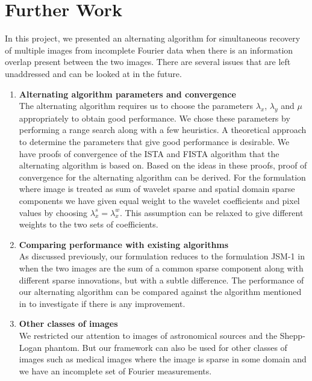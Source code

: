 \section{Further Work}
In this project, we presented an alternating algorithm for simultaneous recovery of multiple images from incomplete Fourier data when there is an information overlap present between the two images. There are several issues that are left unaddressed and can be looked at in the future.
\begin{enumerate}
\item {\bf Alternating algorithm parameters and convergence}\\
\noindent The alternating algorithm requires us to choose the parameters $\lambda_x$, $\lambda_y$ and $\mu$ appropriately to obtain good performance. We chose these parameters by performing a range search along with a few heuristics. A theoretical approach to determine the parameters that give good performance is desirable.
\noindent We have proofs of convergence of the ISTA and FISTA algorithm that the alternating algorithm is based on. Based on the ideas in these proofs, proof of convergence for the alternating algorithm can be derived.
\noindent For the formulation where image is treated as sum of wavelet sparse and spatial domain sparse components we have given equal weight to the wavelet coefficients and pixel values by choosing $\lambda_x^s = \lambda_x^w$. This assumption can be relaxed to give different weights to the two sets of coefficients.
\item {\bf Comparing performance with existing algorithms}\\
\noindent As discussed previously, our formulation reduces to the formulation JSM-1 in \cite{JSM} when the two images are the sum of a common sparse component along with different sparse innovations, but with a subtle difference. The performance of our alternating algorithm can be compared against the algorithm mentioned in \cite{JSMalgo} to investigate if there is any improvement.
\item {\bf Other classes of images}\\
\noindent We restricted our attention to images of astronomical sources and the Shepp-Logan phantom. But our framework can also be used for other classes of images such as medical images where the image is sparse in some domain and we have an incomplete set of Fourier measurements.
\end{enumerate} 

